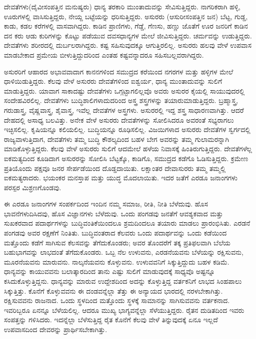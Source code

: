 \vskip 5pt

ದೇವತೆಗಳು(ದೈವೀಸಂಪತ್ತಿನ ಮನುಷ್ಯರು) ಧಾನ್ಯ ತರಕಾರಿ ಮುಂತಾದುವನ್ನು ಸೇವಿಸುತ್ತಿದ್ದರು. ನಾಗರಿಕರಾಗಿ ಹಳ್ಳಿ, ಊರುಗಳಲ್ಲಿ ವಾಸಿಸುತ್ತಿದ್ದರು, ನೇಯ್ದ ಬಟ್ಟೆಯನ್ನು ಧರಿಸುತ್ತಿದ್ದರು. ಅಸುರರು (ಆಸುರೀಸಂಪತ್ತಿನ ಜನ) ಬೆಟ್ಟ, ಗುಡ್ಡ, ಕಾಡು, ಕಡಲ ಕರೆಗಳಲ್ಲಿ ವಾಸವಾಗಿದ್ದರು. ಕಾಡಿನ ಪ್ರಾಣಿಗಳು, ಗೆಡ್ಡೆ, ಗೆಣಸು, ಹಣ್ಣು ಜೊತೆಗೆ ಊರ ಜನರಿಗೆ ಕಾಡಿನ ದನ ಕರು ಆಡು ಕುರಿಗಳನ್ನು ಕೊಟ್ಟು ಪಡೆಯುವ ದವಸಧಾನ್ಯಗಳ ಮೇಲೆ ಜೀವಿಸುತ್ತಿದ್ದರು. ಚರ್ಮವನ್ನು ಉಡುತ್ತಿದ್ದರು. ದೇವತೆಗಳು ಶರೀರದಲ್ಲಿ ದುರ್ಬಲರಾಗಿ\break ದ್ದರು. ಕಷ್ಟ ಸಹಿಸುವುದಕ್ಕೂ ಆಗುತ್ತಿರಲಿಲ್ಲ. ಅಸುರರು ಹಲವು ವೇಳೆ ಉಪವಾಸ ಮಾಡಬೇಕಾದ ಪ್ರಮೇಯ ಬೀಳುತ್ತಿದ್ದುದರಿಂದ ಎಂತಹ ಕಷ್ಟವನ್ನಾದರೂ ಸಹಿಸಬಲ್ಲವರಾಗಿದ್ದರು.

\vskip 7pt

ಅಸುರರಿಗೆ ಆಹಾರದ ಅಭಾವವಾದಾಗ ಕಾನನಗಳಿಂದ ಸಮುದ್ರದ ಕರೆಯಿಂದ ನಗರಗಳ ಮತ್ತು ಹಳ್ಳಿಗಳ ಮೇಲೆ ಧಾಳಿಯಿಡುತ್ತಿದ್ದರು. ಕೆಲವು ವೇಳೆ ಅಸುರರು ದೇವತೆ\break ಗಳಿಂದ ಐಶ್ವರ್ಯ, ಧಾನ್ಯ ಮುಂತಾದುವನ್ನು ಸುಲಿಗೆ ಮಾಡುತ್ತಿದ್ದರು. ಯಾವಾಗ ಸಾಕಾದಷ್ಟು ದೇವತೆಗಳು ಒಗ್ಗಟ್ಟಾಗಲಿಲ್ಲವೊ ಅವರು ಅಸುರರ ಕೈಯಲ್ಲಿ ಸಾಯುವುದರಲ್ಲಿ ಸಂದೇಹವಿರಲಿಲ್ಲ. ದೇವತೆಗಳು ಬುದ್ಧಿಶಾಲಿಗಳಾದುದರಿಂದ ಅಸ್ತ್ರ ಶಸ್ತ್ರಗಳನ್ನು ತಯಾರು\break ಮಾಡುತ್ತಿದ್ದರು. ಬ್ರಹ್ಮಾಸ್ತ್ರ, ಗರುಡಾಸ್ತ್ರ, ವೈಷ್ಣವಾಸ್ತ್ರ, ಶೈವಾಸ್ತ್ರ, ಇವೆಲ್ಲ ದೇವತೆಗಳ ಅಸ್ತ್ರಗಳು. ಅಸುರರಲ್ಲಿ ಇದ್ದ ಶಸ್ತ್ರ ಸಾಧಾರಣವಾಗಿತ್ತು. ಆದರೆ ದೇಹದಲ್ಲಿ ಅಸಾಧ್ಯ ಬಲವಿತ್ತು. ಅನೇಕ ವೇಳೆ ಅಸುರರು ದೇವತೆಗಳನ್ನು ಸೋಲಿಸಿದರೂ ಅವರಂತೆ ಸಭ್ಯರಾಗಲು ಇಚ್ಛಿಸಲಿಲ್ಲ. ಕೃಷಿಯನ್ನೂ ಕಲಿಯಲಿಲ್ಲ. ಬುದ್ಧಿಯನ್ನೂ ರೂಢಿಸಲಿಲ್ಲ. ವಿಜಯಿಗಳಾದ ಅಸುರರು ದೇವತೆಗಳ ಸ್ವರ್ಗದಲ್ಲಿ ರಾಜ್ಯವಾಳುತ್ತಿದಾಗ, ದೇವತೆಗಳು ತಮ್ಮ ಬುದ್ಧಿ ಕೌಶಲ್ಯದಿಂದ ಬಹಳ ಬೇಗ ಅವರನ್ನು ತಮ್ಮ ಗುಲಾಮರನ್ನಾಗಿ ಮಾಡಿಕೊಳ್ಳುತ್ತಿದ್ದರು. ಕೆಲವು ವೇಳೆ ಅಸುರರು ಸುಲಿಗೆ ಆದಮೇಲೆ ಹಳೆಯ ನಿವಾಸಕ್ಕೆ ಹಿಂತಿರುಗುತ್ತಿದ್ದರು. ದೇವತೆಗಳೆಲ್ಲ ಐಕಮತ್ಯದಿಂದ ಕೂಡಿದಾಗ ಅಸುರರನ್ನು ಸೋಲಿಸಿ ಬೆಟ್ಟಕ್ಕೊ, ಕಾಡಿಗೊ, ಸಮುದ್ರದ ಕಡೆಗೊ ಓಡಿಸುತ್ತಿದ್ದರು. ಕ್ರಮೇಣ ಪ್ರತಿಯೊಂದು ಪಕ್ಷವೂ ಜನರ ಸೇರ್ಪಡೆಯಿಂದ ದೊಡ್ಡದಾಯಿತು. ಲಕ್ಷಾಂತರ ದೇವಾಸುರರು ತಮ್ಮ ತಮ್ಮಲ್ಲಿ ಐಕಮತ್ಯರಾದರು. ಭಯಂಕರ ಮನಸ್ತಾಪ ಮತ್ತು ಯುದ್ಧ ಮೊದಲಾಯಿತು. ಇದರ ಜತೆಗೆ ಎರಡೂ ಜನಾಂಗಗಳು ಪರಸ್ಪರ ಮಿಶ್ರಣಗೊಂಡವು.

\vskip 7pt

ಈ ಎರಡೂ ಜನಾಂಗಗಳ ಸಂಪರ್ಕದಿಂದ ಇಂದಿನ ನಮ್ಮ ಸಮಾಜ, ರೀತಿ, ನೀತಿ ಬೆಳೆದುವು. ಹೊಸ ಭಾವನೆಗಳುದಿಸಿದವು, ಹೊಸ ವಿಜ್ಞಾನಗಳು ಬೆಳೆದುವು. ಒಂದು ಪಂಗಡವು ಜನತೆಗೆ ಆವಶ್ಯಕವಾದ ಮತ್ತು ಸುಖಕರವಾದ ಪದಾರ್ಥಗಳನ್ನು ಬುದ್ಧಿವಂತಿಕೆ\break ಯಿಂದಲೂ ಶ್ರಮದಿಂದಲೂ ತಯಾರು ಮಾಡಲು ಪ್ರಾರಂಭಿಸಿತು. ಎರಡನೆ ಪಂಗಡವು ಅವರ ರಕ್ಷಣೆಗೆ ನಿಂತಿತು. ಬುದ್ಧಿವಂತರಾದ ಕೆಲವರು ಒಂದು ಪದಾರ್ಥವನ್ನು ಒಂದು ಕಡೆಯಿಂದ ಮತ್ತೊಂದು ಕಡೆಗೆ ಸಾಗಿಸುವ ಕೆಲಸವನ್ನು ತೆಗೆದುಕೊಂಡರು; ಅವರ ತೊಂದರೆಗೆ ತಕ್ಕ ಪ್ರತಿಫಲವಾಗಿ ಬೆಲೆಯ ಬಹುಭಾಗವನ್ನು ಲಾಭದಂತೆ ತೆಗೆದುಕೊಂಡರು. ಒಬ್ಬ ನೆಲ ಉಳುವನು, ಎರಡನೆಯವನು ಬೆಳೆಯನ್ನು ರಕ್ಷಿಸುವನು, ಮೂರನೆಯವನು ಮಾರುವನು. ನಾಲ್ಕನೆಯವನು ಕೊಳ್ಳುವನು. ಉಳುವವನಿಗೆ ಸಿಕ್ಕುತ್ತಿದ್ದುದು ಬಹಳ ಕಡಿಮೆ. ಧಾನ್ಯವನ್ನು ಕಾಯುವವನು ಬಲಾತ್ಕಾರದಿಂದ ತಾನು ಎಷ್ಟು ಸುಲಿಗೆ ಮಾಡುವುದಕ್ಕೆ ಸಾಧ್ಯವೊ ಅಷ್ಟನ್ನೂ ಕಸಿದುಕೊಳ್ಳುತ್ತಿದ್ದನು. ಧಾನ್ಯವನ್ನು ಮಾರುವ ಉದ್ದೇಶದಿಂದ ಅದನ್ನು ಕೊಳ್ಳುತ್ತಿದ್ದ ವರ್ತಕ\break ನಿಗೆ ಲಾಭದ ಸಿಂಹಪಾಲು ಸಿಕ್ಕುತ್ತಿತ್ತು. ಕೊನೆಗೆ ಕೊಳ್ಳುವವನು ಈ ದಂಡವನ್ನೆಲ್ಲಾ ತೆತ್ತು ಈ ಅನ್ಯಾಯದ ಭಾರದಲ್ಲಿ ನರಳಬೇಕಾಗಿತ್ತು. ರಕ್ಷಿಸುವವನು ರಾಜನಾದ. ಒಂದು ಸ್ಥಳದಿಂದ ಮತ್ತೊಂದು ಸ್ಥಳಕ್ಕೆ ಸಾಮಾನನ್ನು ಸಾಗಿಸುವವನು ವರ್ತಕನಾದ. ಇವರಿಬ್ಬರೂ ಏನನ್ನೂ ಬೆಳೆಯಲಿಲ್ಲ. ಆದರೂ ಮುಖ್ಯ ಭಾಗ್ಯವನ್ನೆಲ್ಲಾ ಸೆಳೆಯುತ್ತಿದ್ದರು. ರೈತನ ದುಡಿತದಿಂದ ಇವರು ಸಂಪತ್ತನ್ನು ಗಳಿಸಿದರು. ಇದನ್ನೆಲ್ಲಾ ಬೆಳೆಸುತ್ತಿದ್ದ ರೈತ ಕೊನೆಗೆ ಕೆಲವು ವೇಳೆ ತಿನ್ನುವುದಕ್ಕೆ ಏನೂ ಇಲ್ಲದೆ ಉಪವಾಸದಿಂದ ದೇವರನ್ನು ಪ್ರಾರ್ಥಿಸಬೇಕಾಗಿತ್ತು.

